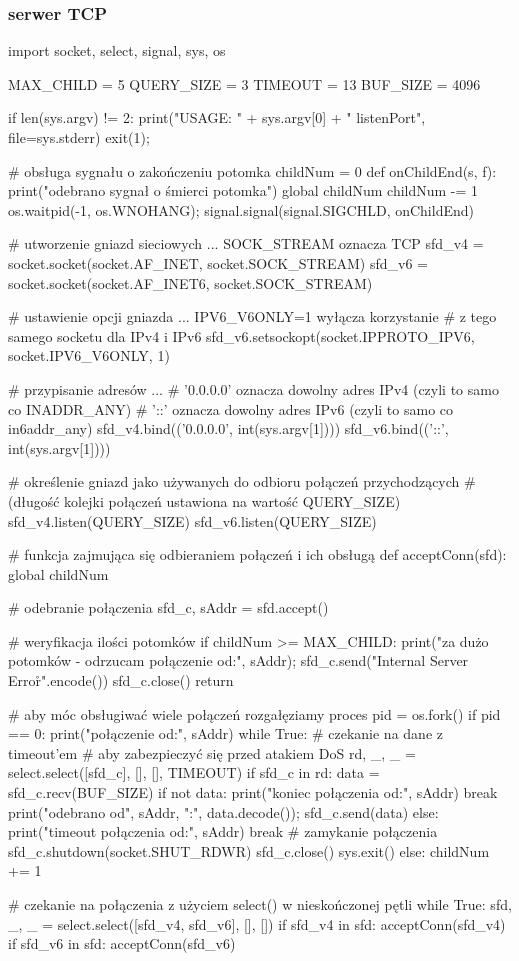 \documentclass{pdfBooklets}
\begin{document}
\subsubsection{serwer TCP}
\begin{CodeFrame*}[python]{}
import socket, select, signal, sys, os

MAX_CHILD = 5
QUERY_SIZE = 3
TIMEOUT = 13
BUF_SIZE = 4096

if len(sys.argv) != 2:
	print("USAGE: " + sys.argv[0] + " listenPort", file=sys.stderr)
	exit(1);

# obsługa sygnału o zakończeniu potomka
childNum = 0
def onChildEnd(s, f):
	print("odebrano sygnał o śmierci potomka")
	global childNum
	childNum -= 1
	os.waitpid(-1, os.WNOHANG);
signal.signal(signal.SIGCHLD, onChildEnd)

# utworzenie gniazd sieciowych ... SOCK_STREAM oznacza TCP
sfd_v4 = socket.socket(socket.AF_INET,  socket.SOCK_STREAM)
sfd_v6 = socket.socket(socket.AF_INET6, socket.SOCK_STREAM)

# ustawienie opcji gniazda ... IPV6_V6ONLY=1 wyłącza korzystanie
# z tego samego socketu dla IPv4 i IPv6
sfd_v6.setsockopt(socket.IPPROTO_IPV6, socket.IPV6_V6ONLY, 1)

# przypisanie adresów ...
# '0.0.0.0' oznacza dowolny adres IPv4 (czyli to samo co INADDR_ANY)
# '::' oznacza dowolny adres IPv6 (czyli to samo co in6addr_any)
sfd_v4.bind(('0.0.0.0', int(sys.argv[1])))
sfd_v6.bind(('::',      int(sys.argv[1])))

# określenie gniazd jako używanych do odbioru połączeń przychodzących
# (długość kolejki połączeń ustawiona na wartość QUERY_SIZE)
sfd_v4.listen(QUERY_SIZE)
sfd_v6.listen(QUERY_SIZE)

# funkcja zajmująca się odbieraniem połączeń i ich obsługą
def acceptConn(sfd):
	global childNum
	
	#  odebranie połączenia
	sfd_c, sAddr = sfd.accept()
	
	# weryfikacja ilości potomków
	if childNum >= MAX_CHILD:
		print("za dużo potomków - odrzucam połączenie od:", sAddr);
		sfd_c.send("Internal Server Error\r\n".encode())
		sfd_c.close()
		return
	
	# aby móc obsługiwać wiele połączeń rozgałęziamy proces
	pid = os.fork()
	if pid == 0:
		print("połączenie od:", sAddr)
		while True:
			# czekanie na dane z timeout'em
			# aby zabezpieczyć się przed atakiem DoS
			rd, _, _ = select.select([sfd_c], [], [], TIMEOUT)
			if sfd_c in rd:
				data = sfd_c.recv(BUF_SIZE)
				if not data:
					print("koniec połączenia od:", sAddr)
					break
				print("odebrano od", sAddr, ":", data.decode());
				sfd_c.send(data)
			else:
				print("timeout połączenia od:", sAddr)
				break
		# zamykanie połączenia
		sfd_c.shutdown(socket.SHUT_RDWR)
		sfd_c.close()
		sys.exit()
	else:
		childNum += 1

# czekanie na połączenia z użyciem select() w nieskończonej pętli
while True:
	sfd, _, _ = select.select([sfd_v4, sfd_v6], [], [])
	if sfd_v4 in sfd:
		acceptConn(sfd_v4)
	if sfd_v6 in sfd:
		acceptConn(sfd_v6)
\end{CodeFrame*}
\end{document}

